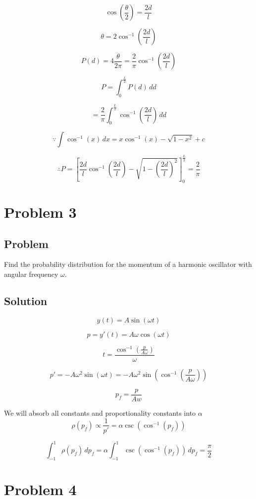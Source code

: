 \documentclass[12pt]{article}
\begin{document}
\[
    \cos{\left(\frac{\theta}{2}\right)} = \frac{2d}{l}
\]


\[
    \theta = 2\cos^{-1}{\left(\frac{2d}{l}\right)}
\]


\[
    P(d) = 4\frac{\theta}{2\pi} = \frac{2}{\pi}\cos^{-1}{\left(\frac{2d}{l}\right)}
\]

\[
    P = \int^{\frac{L}{2}}_{0}P(d)\,dd
\]

\[
    = \frac{2}{\pi}\int^{\frac{L}{2}}_{0}\cos^{-1}{\left(\frac{2d}{l}\right)}\,dd
\]

\[
    \because \int{\cos^{-1}{(x)}\,dx} = x \cos^{-1}{(x)}-\sqrt{1-x^2} + c
\]

\[
    \therefore P = \left[\frac{2d}{l} \cos^{-1}{(\frac{2d}{l})}-\sqrt{1-{\left(\frac{2d}{l}\right)}^2}\right]^\frac{L}{2}_0 = \frac{2}{\pi}
\]

\newpage

\section{Problem 3}

\subsection{Problem}

Find the probability distribution for the momentum of a harmonic oscillator with angular frequency $\omega $.

\subsection{Solution}

\[
    y(t) = A \sin (\omega t)
\]

\[
    p = y'(t) = A \omega \cos (\omega t)
\]

\[
    t = \frac{\cos^{-1}(\frac{p}{A\omega})}{\omega}
\]

\[
    p' = - A \omega^2 \sin (\omega t) = - A \omega^2 \sin (\cos^{-1}(\frac{p}{A\omega}))
\]

\[
    p_f = \frac{p}{Aw}
\]

We will absorb all constants and proportionality constants into \(\alpha\)
\[
    \rho(p_f) \propto \frac{1}{p'} = \alpha \csc (\cos^{-1}(p_f))
\]

\[
    \int^1_{-1} \rho(p_f)\,dp_f = \alpha \int^1_{-1}\csc (\cos^{-1}(p_f))\,dp_f = \frac{\pi}{2}
\]

\newpage

\section{Problem 4}
\end{document}
